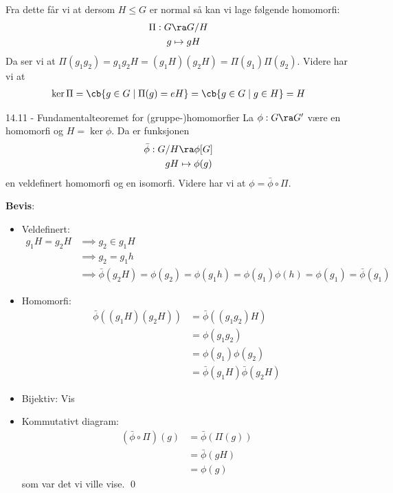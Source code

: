 Fra dette får vi at dersom $H\leq G$ er normal så kan vi lage følgende homomorfi:
\begin{align}
	\Pi : G & \ra G/H    \\
	g       & \mapsto gH
\end{align}
Da ser vi at $\Pi(g_1g_2)=g_1g_2H=(g_1H)(g_2H)=\Pi(g_1)\Pi(g_2)$. Videre har vi at
\begin{align}
	\ker\Pi = \cb{g\in G\mid \Pi(g)=eH}=\cb{g\in G\mid g\in H} = H
\end{align}

\begin{theorem*}{14.11 - Fundamentalteoremet for (gruppe-)homomorfier}{}
	La $\phi: G\ra G'$ være en homomorfi og $H=\ker\phi$. Da er funksjonen
	\begin{align}
		\bar\phi : G/H & \ra \phi[G]     \\
		gH             & \mapsto \phi(g)
	\end{align}
	en veldefinert homomorfi og en isomorfi. Videre har vi at $\phi = \bar\phi \circ \Pi$.
\end{theorem*}

\textbf{Bevis}:
\begin{itemize}
	\item Veldefinert:
	      \begin{align}
		      g_1H=g_2H & \implies g_2\in g_1H                                          \\
		                & \implies g_2=g_1h                                             \\
		                & \implies \bar\phi(g_2H)=\phi(g_2)=\phi(g_1h)=\phi(g_1)\phi(h)
		      =\phi(g_1)=\bar\phi(g_1)
	      \end{align}
	\item Homomorfi:
	      \begin{align}
		      \bar\phi((g_1H)(g_2H)) & = \bar\phi((g_1g_2)H)          \\
		                             & = \phi(g_1g_2)                 \\
		                             & = \phi(g_1)\phi(g_2)           \\
		                             & = \bar\phi(g_1H)\bar\phi(g_2H)
	      \end{align}
	\item Bijektiv: Vis
	\item Kommutativt diagram:
	      \begin{align}
		      (\bar\phi \circ \Pi)(g) & = \bar\phi(\Pi(g)) \\
		                              & = \bar\phi(gH)     \\
		                              & = \phi(g)
	      \end{align}
	      som var det vi ville vise. \qed
\end{itemize}

